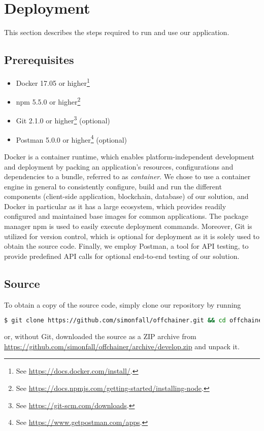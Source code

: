 \section{Deployment}

This section describes the steps required to run and use our application.

\subsection*{Prerequisites}

\begin{itemize}
	\item Docker 17.05 or higher\footnote{See \url{https://docs.docker.com/install/}.}
	\item npm 5.5.0 or higher\footnote{See \url{https://docs.npmjs.com/getting-started/installing-node}.}
	\item Git 2.1.0 or higher\footnote{See \url{https://git-scm.com/downloads}.} (optional)
	\item Postman 5.0.0 or higher\footnote{See \url{https://www.getpostman.com/apps}.} (optional)
\end{itemize}

Docker is a container runtime, which enables platform-independent development and deployment by packing an application's resources, configurations and dependencies to a bundle, referred to as \emph{container}. We chose to use a container engine in general to consistently configure, build and run the different components (client-side application, blockchain, database) of our solution, and Docker in particular as it has a large ecosystem, which provides readily configured and maintained base images for common applications. The package manager npm is used to easily execute deployment commands. Moreover, Git is utilized for version control, which is optional for deployment as it is solely used to obtain the source code. Finally, we employ Postman, a tool for API testing, to provide predefined API calls for optional end-to-end testing of our solution.

\subsection*{Source}

To obtain a copy of the source code, simply clone our repository by running
\begin{lstlisting}[language=bash]
$ git clone https://github.com/simonfall/offchainer.git && cd offchainer 
\end{lstlisting}
or, without Git, downloaded the source as a ZIP archive from \url{https://github.com/simonfall/offchainer/archive/develop.zip} and unpack it.

